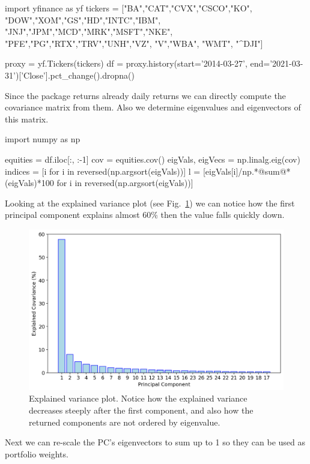 \begin{ipython}
import yfinance as yf
tickers = ["BA","CAT","CVX","CSCO","KO",
           "DOW","XOM","GS","HD","INTC","IBM",
           "JNJ","JPM","MCD","MRK","MSFT","NKE",
           "PFE","PG","RTX","TRV","UNH","VZ",
           "V","WBA", "WMT", "^DJI"]

proxy = yf.Tickers(tickers)           
df = proxy.history(start='2014-03-27',
                   end='2021-03-31')['Close'].pct_change().dropna()
\end{ipython}
	
Since the package returns already daily returns we can directly compute the covariance matrix from them. Also we determine eigenvalues and eigenvectors of this matrix.

\begin{ipython}
import numpy as np

equities = df.iloc[:, :-1]
cov = equities.cov()
eigVals, eigVecs = np.linalg.eig(cov)
indices = [i for i in reversed(np.argsort(eigVals))]
l = [eigVals[i]/np.*@sum@*(eigVals)*100 for i in reversed(np.argsort(eigVals))]
\end{ipython}
	
Looking at the explained variance plot (see Fig.~\ref{fig:explained_variance}) we can notice how the first principal component explains almost 60\% then the value falls quickly down.

\begin{figure}[htb]
	\centering
	\includegraphics[width=.7\textwidth]{figures/portfolio_pca_expl_var}
	\caption{Explained variance plot. Notice how the explained variance decreases steeply after the first component, and also how the returned components are not ordered by eigenvalue.}
	\label{fig:explained_variance}
\end{figure}
		
Next we can re-scale the PC's eigenvectors to sum up to 1 so they can be used as portfolio weights.
	
